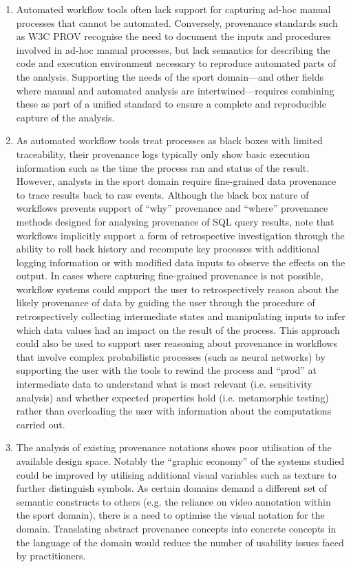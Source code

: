 \begin{enumerate}
\item Automated workflow tools often lack support for capturing ad-hoc
manual processes that cannot be automated. Conversely, provenance
standards such as W3C PROV recognise the need to document the inputs and
procedures involved in ad-hoc manual processes, but lack semantics for
describing the code and execution environment necessary to reproduce
automated parts of the analysis. Supporting the needs of the sport
domain---and other fields where manual and automated analysis are
intertwined---requires combining these as part of a unified standard to
ensure a complete and reproducible capture of the analysis.

\item As automated workflow tools treat processes as black boxes with
limited traceability, their provenance logs typically only show basic
execution information such as the time the process ran and status of the
result. However, analysts in the sport domain require fine-grained data
provenance to trace results back to raw events. Although the black box
nature of workflows prevents support of ``why'' provenance and ``where''
provenance methods designed for analysing provenance of SQL query
results, note that workflows implicitly support a form of
retrospective investigation through the ability to roll back history and
recompute key processes with additional logging information or with
modified data inputs to observe the effects on the output. In cases
where capturing fine-grained provenance is not possible, workflow systems could support the user to retrospectively reason
about the likely provenance of data by guiding the user through the
procedure of retrospectively collecting intermediate states and
manipulating inputs to infer which data values had an impact on the
result of the process. This approach could also be used to support user
reasoning about provenance in workflows that involve complex
probabilistic processes (such as neural networks) by supporting the user
with the tools to rewind the process and ``prod'' at intermediate data
to understand what is most relevant (i.e. sensitivity analysis) and
whether expected properties hold (i.e. metamorphic testing) rather than
overloading the user with information about the computations carried
out.

\item The analysis of existing provenance notations shows poor utilisation of the
available design space. Notably the ``graphic economy'' of the systems
studied could be improved by utilising additional visual variables such
as texture to further distinguish symbols. As certain domains demand a
different set of semantic constructs to others (e.g. the reliance on
video annotation within the sport domain), there is a need to optimise
the visual notation for the domain. Translating abstract provenance
concepts into concrete concepts in the language of the domain would
reduce the number of usability issues faced by practitioners.
\end{enumerate}

